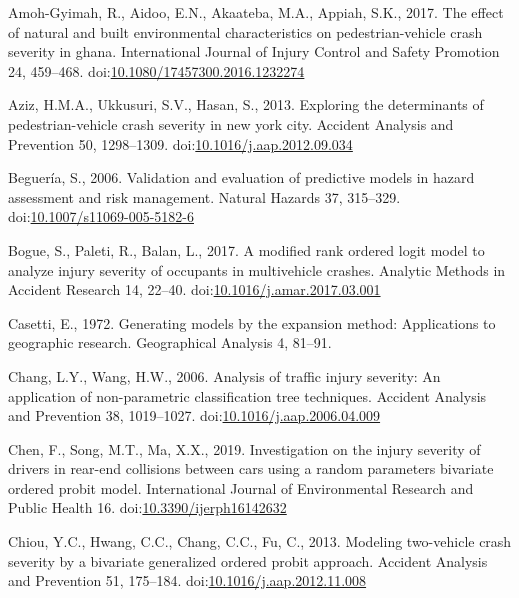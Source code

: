 \documentclass[]{elsarticle} %
\begin{document}
\hypertarget{refs}{}
\leavevmode\hypertarget{ref-Amoh2017effect}{}%
Amoh-Gyimah, R., Aidoo, E.N., Akaateba, M.A., Appiah, S.K., 2017. The
effect of natural and built environmental characteristics on
pedestrian-vehicle crash severity in ghana. International Journal of
Injury Control and Safety Promotion 24, 459--468.
doi:\href{https://doi.org/10.1080/17457300.2016.1232274}{10.1080/17457300.2016.1232274}

\leavevmode\hypertarget{ref-Aziz2013exploring}{}%
Aziz, H.M.A., Ukkusuri, S.V., Hasan, S., 2013. Exploring the
determinants of pedestrian-vehicle crash severity in new york city.
Accident Analysis and Prevention 50, 1298--1309.
doi:\href{https://doi.org/10.1016/j.aap.2012.09.034}{10.1016/j.aap.2012.09.034}

\leavevmode\hypertarget{ref-Begueria2006validation}{}%
Beguería, S., 2006. Validation and evaluation of predictive models in
hazard assessment and risk management. Natural Hazards 37, 315--329.
doi:\href{https://doi.org/10.1007/s11069-005-5182-6}{10.1007/s11069-005-5182-6}

\leavevmode\hypertarget{ref-Bogue2017modified}{}%
Bogue, S., Paleti, R., Balan, L., 2017. A modified rank ordered logit
model to analyze injury severity of occupants in multivehicle crashes.
Analytic Methods in Accident Research 14, 22--40.
doi:\href{https://doi.org/10.1016/j.amar.2017.03.001}{10.1016/j.amar.2017.03.001}

\leavevmode\hypertarget{ref-Casetti1972generating}{}%
Casetti, E., 1972. Generating models by the expansion method:
Applications to geographic research. Geographical Analysis 4, 81--91.

\leavevmode\hypertarget{ref-Chang2006analysis}{}%
Chang, L.Y., Wang, H.W., 2006. Analysis of traffic injury severity: An
application of non-parametric classification tree techniques. Accident
Analysis and Prevention 38, 1019--1027.
doi:\href{https://doi.org/10.1016/j.aap.2006.04.009}{10.1016/j.aap.2006.04.009}

\leavevmode\hypertarget{ref-Chen2019investigation}{}%
Chen, F., Song, M.T., Ma, X.X., 2019. Investigation on the injury
severity of drivers in rear-end collisions between cars using a random
parameters bivariate ordered probit model. International Journal of
Environmental Research and Public Health 16.
doi:\href{https://doi.org/10.3390/ijerph16142632}{10.3390/ijerph16142632}

\leavevmode\hypertarget{ref-Chiou2013modeling}{}%
Chiou, Y.C., Hwang, C.C., Chang, C.C., Fu, C., 2013. Modeling
two-vehicle crash severity by a bivariate generalized ordered probit
approach. Accident Analysis and Prevention 51, 175--184.
doi:\href{https://doi.org/10.1016/j.aap.2012.11.008}{10.1016/j.aap.2012.11.008}
\end{document}
